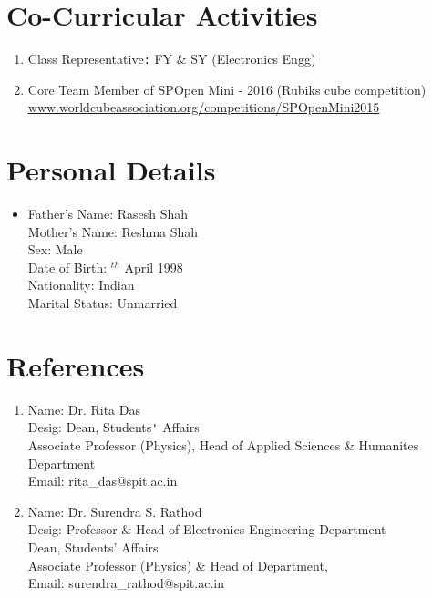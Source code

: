 \documentclass{article}
\begin{document}
	\section*{Co-Curricular Activities}
		\begin{enumerate}
			\item Class Representative\verb|:| FY \& SY (Electronics Engg) 
			\item Core Team Member of SPOpen Mini - 2016 (Rubiks cube competition)\\
			\url{www.worldcubeassociation.org/competitions/SPOpenMini2015}
		\end{enumerate}	
	
	\section*{Personal Details}
		\begin{itemize}
			\item[]
			\begin{tabbing}
				Father's Name: \=Rasesh Shah\\ 
				Mother's Name: \>Reshma Shah\\ 
				Sex: \>Male\\ 
				Date of Birth: $^{th}$ April 1998\\ 
				Nationality: \>Indian\\ 
				Marital Status: \>Unmarried
			\end{tabbing}
		\end{itemize}	
	
	\section*{References}
		\begin{enumerate}
			\item
			\begin{tabbing}
				Name: 		 \=Dr. Rita Das\\ 
				Desig: \>Dean, Students\verb|'| Affairs\\
				\>Associate Professor (Physics), Head of Applied Sciences \& Humanites Department\\
				Email: \>rita\_das@spit.ac.in\\ 
			\end{tabbing}	
		
			\item
			\begin{tabbing}
				Name: 	 \=Dr. Surendra S. Rathod\\
				Desig:
				\>Professor \& Head of Electronics Engineering Department\\ 
				\>Dean, Students’ Affairs\\
				\>Associate Professor (Physics) \& Head of Department,\\ 
				Email: \>surendra\_rathod@spit.ac.in\\ 
			\end{tabbing}	
			
		\end{enumerate}
	
\end{document}
